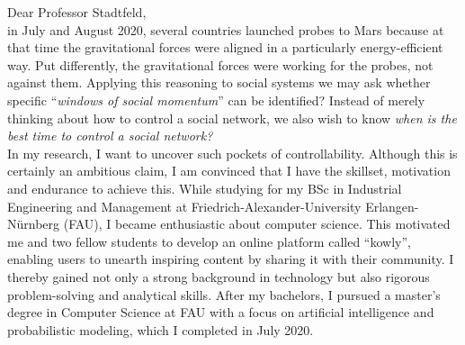 Dear Professor Stadtfeld,\\

in July and August 2020, several countries launched probes to Mars because at that time the gravitational forces were aligned in a particularly energy-efficient way. 
Put differently, the gravitational forces were working for the probes, not against them.
Applying this reasoning to social systems we may ask whether specific ``\textit{windows of social momentum}'' can be identified? 
Instead of merely thinking about how to control a social network, we also wish to know \textit{when is the best time to control a social network?}\\

In my research, I want to uncover such pockets of controllability. 
Although this is certainly an ambitious claim, I am convinced that I have the skillset, motivation and endurance to achieve this. 
While studying for my BSc in Industrial Engineering and Management at Friedrich-Alexander-University Erlangen-Nürnberg (FAU), I became enthusiastic about computer science. 
This motivated me and two fellow students to develop an online platform called ``kowly'', enabling users to unearth inspiring content by sharing it with their community. 
I thereby gained not only a strong background in technology but also rigorous problem-solving and analytical skills.
After my bachelors, I pursued a master's degree in Computer Science at FAU with a focus on artificial intelligence and probabilistic modeling, which I completed in July 2020. \\

